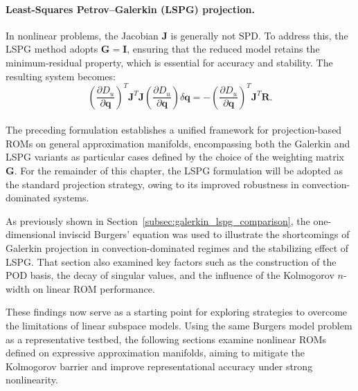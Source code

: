 \paragraph{Least-Squares Petrov–Galerkin (LSPG) projection.} 
In nonlinear problems, the Jacobian \( \mathbf{J} \) is generally not SPD. To address this, the LSPG method adopts \( \mathbf{G} = \mathbf{I} \), ensuring that the reduced model retains the minimum-residual property, which is essential for accuracy and stability. The resulting system becomes:
\begin{equation}
\left( \frac{\partial D_u}{\partial \mathbf{q}} \right)^T 
\mathbf{J}^T 
\mathbf{J} 
\left( \frac{\partial D_u}{\partial \mathbf{q}} \right) \delta \mathbf{q} 
= - \left( \frac{\partial D_u}{\partial \mathbf{q}} \right)^T \mathbf{J}^T \mathbf{R}.
\label{eq:prom_general_lspg}
\end{equation}

\paragraph{}
The preceding formulation establishes a unified framework for projection-based ROMs on general approximation manifolds, encompassing both the Galerkin and LSPG variants as particular cases defined by the choice of the weighting matrix \( \mathbf{G} \). For the remainder of this chapter, the LSPG formulation will be adopted as the standard projection strategy, owing to its improved robustness in convection-dominated systems.

As previously shown in Section~\ref{subsec:galerkin_lspg_comparison}, the one-dimensional inviscid Burgers’ equation was used to illustrate the shortcomings of Galerkin projection in convection-dominated regimes and the stabilizing effect of LSPG. That section also examined key factors such as the construction of the POD basis, the decay of singular values, and the influence of the Kolmogorov \( n \)-width on linear ROM performance.

These findings now serve as a starting point for exploring strategies to overcome the limitations of linear subspace models. Using the same Burgers model problem as a representative testbed, the following sections examine nonlinear ROMs defined on expressive approximation manifolds, aiming to mitigate the Kolmogorov barrier and improve representational accuracy under strong nonlinearity.

